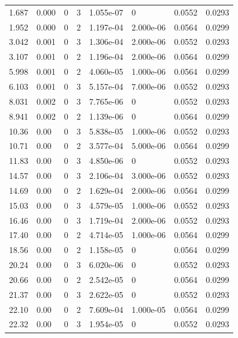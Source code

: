\documentclass[preview]{standalone}
\begin{document}
{{\begin{tabular}{L{1.2cm}C{1.2cm} C{0.3cm}C{0.5cm} C{1.4cm}C{1.4cm} C{1.4cm}C{1.4cm}}
  1.687  &  0.000  & 0     &  3 &  1.055e-07  & 0  & 0.0552 &  0.0293   \\ 
  1.952  &  0.000  & 0     &  2 &  1.197e-04  & 2.000e-06  & 0.0564 &  0.0299   \\ 
  3.042  &  0.001  & 0     &  3 &  1.306e-04  & 2.000e-06  & 0.0552 &  0.0293   \\ 
  3.107  &  0.001  & 0     &  2 &  1.196e-04  & 2.000e-06  & 0.0564 &  0.0299   \\ 
  5.998  &  0.001  & 0     &  2 &  4.060e-05  & 1.000e-06  & 0.0564 &  0.0299   \\ 
  6.103  &  0.001  & 0     &  3 &  5.157e-04  & 7.000e-06  & 0.0552 &  0.0293   \\ 
  8.031  &  0.002  & 0     &  3 &  7.765e-06  & 0  & 0.0552 &  0.0293   \\ 
  8.941  &  0.002  & 0     &  2 &  1.139e-06  & 0  & 0.0564 &  0.0299   \\ 
  10.36  &  0.00  & 0     &  3 &  5.838e-05  & 1.000e-06  & 0.0552 &  0.0293   \\ 
  10.71  &  0.00  & 0     &  2 &  3.577e-04  & 5.000e-06  & 0.0564 &  0.0299   \\ 
  11.83  &  0.00  & 0     &  3 &  4.850e-06  & 0  & 0.0552 &  0.0293   \\ 
  14.57  &  0.00  & 0     &  3 &  2.106e-04  & 3.000e-06  & 0.0552 &  0.0293   \\ 
  14.69  &  0.00  & 0     &  2 &  1.629e-04  & 2.000e-06  & 0.0564 &  0.0299   \\ 
  15.03  &  0.00  & 0     &  3 &  4.579e-05  & 1.000e-06  & 0.0552 &  0.0293   \\ 
  16.46  &  0.00  & 0     &  3 &  1.719e-04  & 2.000e-06  & 0.0552 &  0.0293   \\ 
  17.40  &  0.00  & 0     &  2 &  4.714e-05  & 1.000e-06  & 0.0564 &  0.0299   \\ 
  18.56  &  0.00  & 0     &  2 &  1.158e-05  & 0  & 0.0564 &  0.0299   \\ 
  20.24  &  0.00  & 0     &  3 &  6.020e-06  & 0  & 0.0552 &  0.0293   \\ 
  20.66  &  0.00  & 0     &  2 &  2.542e-05  & 0  & 0.0564 &  0.0299   \\ 
  21.37  &  0.00  & 0     &  3 &  2.622e-05  & 0  & 0.0552 &  0.0293   \\ 
  22.10  &  0.00  & 0     &  2 &  7.609e-04  & 1.000e-05  & 0.0564 &  0.0299   \\ 
  22.32  &  0.00  & 0     &  3 &  1.954e-05  & 0  & 0.0552 &  0.0293   \\ 

\end{tabular}}}
\end{document}
